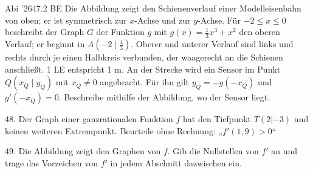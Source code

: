 \documentclass[11pt]{article}
\begin{document}
\pfgruppe{}
\begin{pfaufg}{Abi ’26}{47.}{2 BE}
Die Abbildung zeigt den Schienenverlauf einer Modelleisenbahn von oben; er ist symmetrisch zur $x$-Achse und zur $y$-Achse. Für $-2 \le x \le 0$ beschreibt der Graph $G$ der Funktion $g$ mit $g(x) = \tfrac{1}{3}x^3 + x^2$ den oberen Verlauf; er beginnt in $A\left(-2 \mid \tfrac{4}{3}\right)$. Oberer und unterer Verlauf sind links und rechts durch je einen Halbkreis verbunden, der waagerecht an die Schienen anschließt. 1 LE entspricht 1 m. An der Strecke wird ein Sensor im Punkt $Q(x_Q \mid y_Q)$ mit $x_Q \neq 0$ angebracht. Für ihn gilt $y_Q = -g(-x_Q)$ und $g'(-x_Q) = 0$. Beschreibe mithilfe der Abbildung, wo der Sensor liegt.
\par\smallskip\noindent {}\par
{}
\end{pfaufg}
\pfgruppe{}
\begin{pfaufg}{}{48.}{}
Der Graph einer ganzrationalen Funktion $f$ hat den Tiefpunkt $T(2 | -3)$ und keinen weiteren Extrempunkt. Beurteile ohne Rechnung: „$f'(1{,}9) > 0$“ 
\end{pfaufg}
\pfgruppe{}
\begin{pfaufg}{}{49.}{}
Die Abbildung zeigt den Graphen von $f$. Gib die Nullstellen von $f'$ an und trage das Vorzeichen von $f'$ in jedem Abschnitt dazwischen ein.
\par\smallskip\noindent \begin{ksys}[xmin=-3,xmax=5,ymin=-5,ymax=5,ablesen]  \end{ksys}\par
{}
\end{pfaufg}
\end{document}
